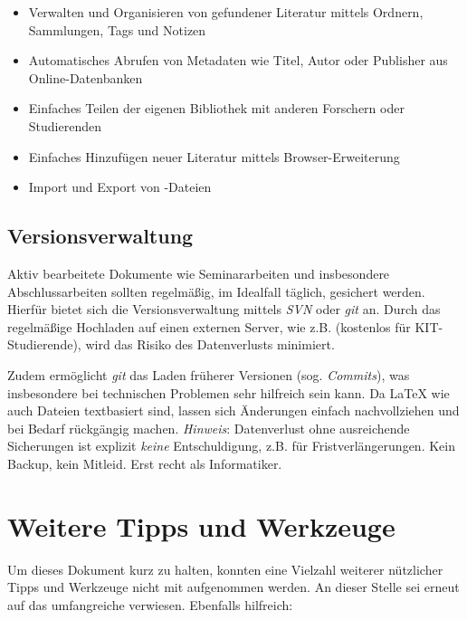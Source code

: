 \smallskip
\begin{itemize}
    \item Verwalten und Organisieren von gefundener Literatur mittels Ordnern, Sammlungen, Tags und Notizen
    \item Automatisches Abrufen von Metadaten wie Titel, Autor oder Publisher aus Online-Datenbanken
    \item Einfaches Teilen der eigenen Bibliothek mit anderen Forschern oder Studierenden
    \item Einfaches Hinzufügen neuer Literatur mittels Browser-Erweiterung
    \item Import und Export von \bibtex-Dateien
\end{itemize}

\subsection{Versionsverwaltung}
\label{sec:Verwalten:Version}

Aktiv bearbeitete Dokumente wie Seminararbeiten und insbesondere Abschlussarbeiten sollten regelmäßig, im Idealfall täglich, gesichert werden. 
Hierfür bietet sich die Versionsverwaltung mittels \emph{SVN} oder \emph{git} an. 
Durch das regelmäßige Hochladen auf einen externen Server, wie z.B.  (kostenlos für KIT-Studierende), wird das Risiko des Datenverlusts minimiert. 

Zudem ermöglicht \emph{git} das Laden früherer Versionen (sog. \emph{Commits}), was insbesondere bei technischen Problemen sehr hilfreich sein kann. 
Da \LaTeX\- wie auch \bibtex\-Dateien textbasiert sind, lassen sich Änderungen einfach nachvollziehen und bei Bedarf rückgängig machen. 
\emph{Hinweis}: Datenverlust ohne ausreichende Sicherungen ist explizit \emph{keine} Entschuldigung, z.B. für Fristverlängerungen. 
Kein Backup, kein Mitleid. 
Erst recht als Informatiker.

\section{Weitere Tipps und Werkzeuge}
\label{sec:Tipps}

Um dieses Dokument kurz zu halten, konnten eine Vielzahl weiterer nützlicher Tipps und Werkzeuge nicht mit aufgenommen werden. An dieser Stelle sei erneut auf das umfangreiche  verwiesen. Ebenfalls hilfreich:

